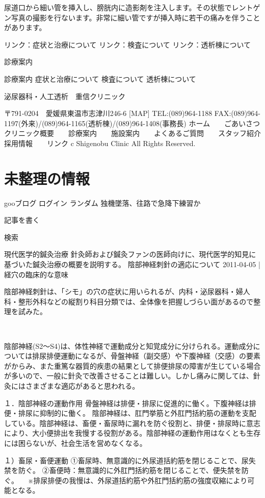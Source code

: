    尿道口から細い管を挿入し、膀胱内に造影剤を注入します。その状態でレントゲン写真の撮影を行ないます。非常に細い管ですが挿入時に若干の痛みを伴うことがあります。

    リンク：症状と治療について リンク：検査について リンク：透析棟について 

診療案内

    診療案内
    症状と治療について
    検査について
    透析棟について

泌尿器科・人工透析　重信クリニック

〒791-0204　愛媛県東温市志津川246-6 [MAP]
TEL:(089)964-1188
FAX:(089)964-1197(外来)/(089)964-1165(透析棟)/(089)964-1408(事務長)
ホーム　　ごあいさつ　　クリニック概要　　診療案内　　施設案内　　よくあるご質問　　スタッフ紹介　　採用情報　　リンク
c Shigenobu Clinic All Rights Reserved.

\section{未整理の情報}


    gooブログ ログイン ランダム 独機墜落、往路で急降下練習か 

	

    記事を書く 

    検索  

現代医学的鍼灸治療
針灸師および鍼灸ファンの医師向けに、現代医学的知見に基づいた鍼灸治療の概要を説明する。
陰部神経刺針の適応について
2011-04-05 | 経穴の臨床的な意味

陰部神経刺針は、「シモ」の穴の症状に用いられるが、内科・泌尿器科・婦人科・整形外科などの縦割り科目分類では、全体像を把握しづらい面があるので整理を試みた。

　

陰部神経(S2～S4)は、体性神経で運動成分と知覚成分に分けられる。運動成分については排尿排便運動になるが、骨盤神経（副交感）や下腹神経（交感）の要素がからみ、また重篤な器質的疾患の結果として排便排尿の障害が生じている場合が多いので、一般に針灸で改善させることは難しい。しかし痛みに関しては、針灸にはさまざまな適応があると思われる。

１．陰部神経の運動作用  
骨盤神経は排便・排尿に促進的に働く。下腹神経は排便・排尿に抑制的に働く。
陰部神経は、肛門挙筋と外肛門括約筋の運動を支配している。陰部神経は、畜便・畜尿時に漏れを防ぐ役割と、排便・排尿時に意志により、大小便排出を我慢する役割がある。陰部神経の運動作用はなくとも生存には困らないが、社会生活を営めなくなる。

１）畜尿・畜便運動
①畜尿時、無意識的に外尿道括約筋を閉じることで、尿失禁を防ぐ。
②畜便時：無意識的に外肛門括約筋を閉じることで、便失禁を防ぐ。
　※排尿排便の我慢は、外尿道括約筋や外肛門括約筋の強度収縮により可能となる。

